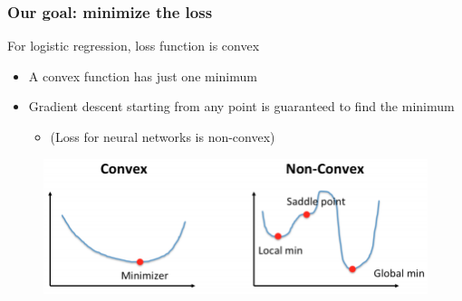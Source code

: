 \documentclass[13.5pt,aspecratio=169]{beamer}
\begin{document}
\begin{frame}
\onehalfspacing
	\frametitle{Our goal: minimize the loss}
    \begin{block}{} %
		For logistic regression, loss function is convex
	\end{block}
	    \begin{itemize}
		    \item A convex function has just one minimum
                \item Gradient descent starting from any point is
                guaranteed to find the minimum

                
                \begin{itemize}
                   
                            \item (Loss for neural networks is non-convex)
                                                
                \end{itemize}
		\end{itemize}
        \begin{figure}[h]
            \centering
            \includegraphics[scale=0.5]{convex.png}
        \end{figure}
\end{frame}


\end{document}
